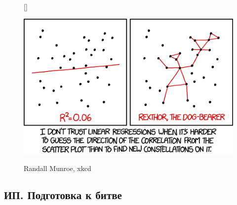 \documentclass[12pt, a4paper]{article}
\begin{document}
\begin{figure}[h!]
[\FBwidth]
{\caption*{Randall Munroe, xkcd}}
{\includegraphics[width=12cm]{figures/linear_regression.png}}
\end{figure}


\subsection{ИП. Подготовка к битве}
\end{document}
